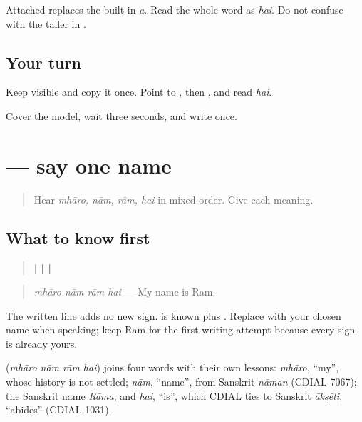 Attached \textbf{} replaces the built-in \emph{a}. Read the whole word \textbf{} as \emph{hai}. Do not confuse \textbf{} with the taller \textbf{} in \textbf{}.

\subsection*{Your turn}
Keep \textbf{} visible and copy it once. Point to \textbf{}, then \textbf{}, and read \emph{hai}.

\begin{tcolorbox}[breakable,colback=teal!4,colframe=teal!35!black,title={Before you move on}]
Cover the model, wait three seconds, and write \textbf{} once.
\end{tcolorbox}
\section[\texorpdfstring{\mw{म्हारो} \mw{नाम} \mw{राम} \mw{है।} (mhāro nām rām hai)}{म्हारो नाम राम है। (mhāro nām rām hai)}]{    — say one name}

\label{lesson:MW-C05-answer}



\begin{quote}
Hear \emph{mhāro, nām, rām, hai} in mixed order. Give each meaning.
\end{quote}

\subsection*{What to know first}
\begin{quote}
\textbf{ |  |  | }
\end{quote}

\begin{quote}
\emph{mhāro nām rām hai} — My name is Ram.
\end{quote}

The written line adds no new sign. \textbf{} is known \textbf{} plus \textbf{}. Replace \textbf{} with your chosen name when speaking; keep Ram for the first writing attempt because every sign is already yours.

\begin{cousinweb}
\textbf{   } (\emph{mhāro nām rām hai}) joins four words with their own lessons: \emph{mhāro}, \textquotedblleft{}my\textquotedblright{}, whose history is not settled; \emph{nām}, \textquotedblleft{}name\textquotedblright{}, from Sanskrit \emph{nāman} (CDIAL 7067); the Sanskrit name \emph{Rāma}; and \emph{hai}, \textquotedblleft{}is\textquotedblright{}, which CDIAL ties to Sanskrit \emph{ākṣēti}, \textquotedblleft{}abides\textquotedblright{} (CDIAL 1031).
\end{cousinweb}


